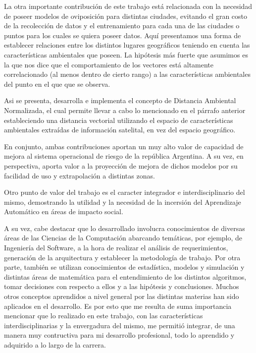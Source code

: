   \par La otra importante contribución de este trabajo está relacionada con la
    necesidad de poseer modelos de oviposición para distintas ciudades, evitando
    el gran costo de la recolección de datos y el entrenamiento para cada una de
    las ciudades o puntos para los cuales se quiera poseer datos. Aquí presentamos
    una forma de establecer relaciones entre los distintos lugares geográficos teniendo
    en cuenta las características ambientales que poseen. La hipótesis más fuerte que
    asumimos es la que nos dice que el comportamiento de los vectores está altamente
    correlacionado (al menos dentro de cierto rango) a las características ambientales
    del punto en el que que se observa.

  \par Asi se presenta, desarrolla e implementa el concepto de Distancia Ambiental
    Normalizada, el cual permite
    llevar a cabo lo mencionado en el párrafo anterior estableciendo una distancia
    vectorial utilizando el espacio de características ambientales extraídas de
    información satelital, en vez del espacio geográfico.

  \par En conjunto, ambas contribuciones aportan un muy alto valor de capacidad de
    mejora al sistema operacional de riesgo de la república Argentina. A su vez,
    en perspectiva, aporta valor a la proyección de mejora de dichos modelos por
    su facilidad de uso y extrapolación a distintas zonas.

  \par Otro punto de valor del trabajo es el caracter integrador e
    interdisciplinario del mismo, demostrando la utilidad y la necesidad
    de la incersión del Aprendizaje Automático en áreas de impacto social.

  \par A su vez, cabe destacar que lo desarrollado involucra conocimientos de
    diversas áreas de las Ciencias de la Computación abarcando temáticas, por ejemplo, de
    Ingeniería del Software, a la hora de realizar el análisis de requerimientos,
    generación de la arquitectura y establecer la metodología de trabajo.
    Por otra parte, también se utilizan conocimientos de estadística, modelos y
    simulación y distintas áreas de matemática para el entendimiento de los
    distintos algoritmos, tomar decisiones con respecto a
    ellos y a las hipótesis y conclusiones. Muchos otros conceptos aprendidos
    a nivel general por las distintas materias han sido aplicados en el desarrollo.
    Es por esto que me resulta de suma importancia mencionar que lo realizado en
    este trabajo, con las características interdisciplinarias y la envergadura
    del mismo, me permitió integrar, de una manera muy contructiva para mi
    desarrollo profesional, todo lo aprendido y adquirido a lo largo de la carrera.

